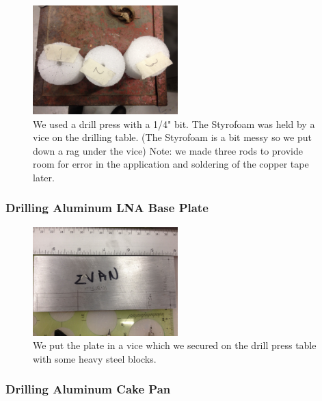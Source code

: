 \documentclass[11pt]{article} %
\begin{document}
\begin{figure}
  \centering
  \caption{We used a drill press with a 1/4" bit. The Styrofoam was held by a vice on the drilling table. (The Styrofoam is a bit messy so we put down a rag under the vice) Note: we made three rods to provide room for error in the application and soldering of the copper tape later. }
  \includegraphics[width=0.50\textwidth]{feed/02.jpeg}
\end{figure}









\subsubsection{Drilling Aluminum LNA Base Plate}

\begin{figure}
  \centering
  \caption{ We put the plate in a vice which we secured on the drill press table with some heavy steel blocks. }
  \includegraphics[width=0.50\textwidth]{feed/03.jpeg}
\end{figure}



\subsubsection{Drilling Aluminum Cake Pan}
\end{document}
